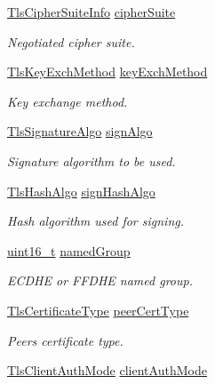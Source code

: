 \begin{DoxyCompactItemize}
\hyperlink{structTlsCipherSuiteInfo}{Tls\+Cipher\+Suite\+Info} \hyperlink{struct__TlsContext_a1917578a8aa5eb1082db32ea57d39c48}{cipher\+Suite}
\begin{DoxyCompactList}\small\item\em Negotiated cipher suite. \end{DoxyCompactList}\item 
\hyperlink{tls_8h_a10c9078f6485419c2b8644b573ef0b75}{Tls\+Key\+Exch\+Method} \hyperlink{struct__TlsContext_abbb6fdffcc7e15135e682980ef85479b}{key\+Exch\+Method}
\begin{DoxyCompactList}\small\item\em Key exchange method. \end{DoxyCompactList}\item 
\hyperlink{tls_8h_abe6ce436cb0d777df29e0af7bf800223}{Tls\+Signature\+Algo} \hyperlink{struct__TlsContext_aac060e84dca11de2709484e429e0320a}{sign\+Algo}
\begin{DoxyCompactList}\small\item\em Signature algorithm to be used. \end{DoxyCompactList}\item 
\hyperlink{tls_8h_a98b0299cd7e197edc67123642089156d}{Tls\+Hash\+Algo} \hyperlink{struct__TlsContext_ab9cd4342a2e92de65a1b5de453f092a7}{sign\+Hash\+Algo}
\begin{DoxyCompactList}\small\item\em Hash algorithm used for signing. \end{DoxyCompactList}\item 
\hyperlink{stdint_8h_a273cf69d639a59973b6019625df33e30}{uint16\+\_\+t} \hyperlink{struct__TlsContext_aa74949fa9cb49787de6ca8bc1b222280}{named\+Group}
\begin{DoxyCompactList}\small\item\em E\+C\+D\+HE or F\+F\+D\+HE named group. \end{DoxyCompactList}\item 
\hyperlink{tls_8h_a9bd45859e2bffbd3edb8beff07240ffd}{Tls\+Certificate\+Type} \hyperlink{struct__TlsContext_a9b5f27d5321b90f2a874719b289996fa}{peer\+Cert\+Type}
\begin{DoxyCompactList}\small\item\em Peer\textquotesingle{}s certificate type. \end{DoxyCompactList}\item 
\hyperlink{tls_8h_a657708ec632fe90da5a94cf667118527}{Tls\+Client\+Auth\+Mode} \hyperlink{struct__TlsContext_ad1305e63b697aaed05d6ba3722bfbd59}{client\+Auth\+Mode}

\end{DoxyCompactItemize}
